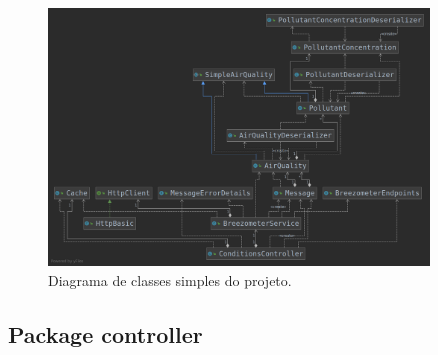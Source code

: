 \begin{figure}[h]
   \centering
   \includegraphics[width=0.90\textwidth]{images/simple_diagram}
   \caption{Diagrama de classes simples do projeto.}
   \label{fig:simple_diagram}
\end{figure}

\subsection{Package controller}
